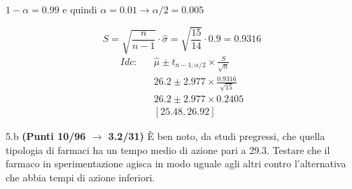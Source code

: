 \documentclass[
  11pt,
]{book}
\theoremstyle{mytheoremstyle}
\theoremstyle{mydefstyle}
\newenvironment{sol}
  {
  \begin{tcolorbox}[enhanced,breakable,arc=0.1mm,boxrule=1pt,colback=white,colframe=iblue,
  title=\bf \fontfamily{lmss}\selectfont \hspace{.5 cm} Soluzione,drop fuzzy shadow]

}{
\end{tcolorbox}
  }
\begin{document}
\begin{sol}
\(1-\alpha =0.99\) e quindi \(\alpha=0.01\rightarrow \alpha/2=0.005\)

\[
      S  =\sqrt{\frac {n}{n-1}}\cdot\hat\sigma =
     \sqrt{\frac { 15 }{ 14 }}\cdot 0.9 = 0.9316 
\]
\begin{eqnarray*}
  Idc: & &  \hat\mu \pm  t_{n-1;\alpha/2} \times \frac{S}{\sqrt{n}} \\
     & &  26.2 \pm  2.977 \times \frac{ 0.9316 }{\sqrt{ 15 }} \\
     & &  26.2 \pm  2.977 \times  0.2405 \\
     & & [ 25.48 ,  26.92 ]
\end{eqnarray*}

\end{sol}

5.b \textbf{(Punti 10/96 \(\rightarrow\) 3.2/31)} È ben noto, da studi pregressi, che quella tipologia di farmaci ha un tempo medio
di azione pari a 29.3. Testare che il farmaco in sperimentazione agisca in modo uguale agli altri contro l'alternativa che abbia tempi di azione inferiori.
\end{document}
